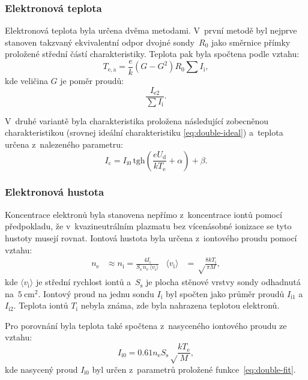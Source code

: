 \documentclass{protokol}
\newcommand\elemcharge{e}
\newcommand\boltzmann{k}
\newcommand{\tgh}{\mathrm{tgh}}
\newcommand\iion{I_\mathrm{i}}
\newcommand\dension{n_\mathrm{i}}
\newcommand\denselec{n_\mathrm{e}}
\newcommand\sheathsurf{S_\mathrm{s}}
\newcommand\tempion{T_\mathrm{i}}
\newcommand\tempelec{T_\mathrm{e}}
\newcommand\tempeleca{T_\mathrm{e,a}}
\newcommand\massion{M}
\newcommand\iioni{I_{\mathrm{i}1}}
\newcommand\iionii{I_{\mathrm{i}2}}
\newcommand\iionsat{I_{\mathrm{i}0}}
\newcommand\ielecii{I_{\mathrm{e}2}}
\newcommand\idouble{I_{\mathrm{c}}}
\newcommand\udouble{U_\mathrm{d}}
\newcommand\speedion{v_\mathrm{i}}
\newcommand\eqresist{R_0}
\begin{document}
\subsubsection{Elektronová teplota}
\label{sec:double-tempelec}
Elektronová teplota byla určena dvěma metodami.
V~první metodě byl nejprve stanoven takzvaný ekvivalentní odpor
dvojné sondy~$\eqresist$ jako směrnice přímky proložené střední
částí charakteristiky.
Teplota pak byla spočtena podle vztahu:
\begin{equation}
	\label{eq:tempeleca-double}
	\tempeleca = \frac{\elemcharge}{\boltzmann}
		(G - G^2) \eqresist \sum \iion,
\end{equation}
kde veličina $G$ je poměr proudů:
\begin{equation}
	\label{eq:g}
	\frac{\ielecii}{\sum \iion}.
\end{equation}

\newcommand\paramc{\alpha}
\newcommand\parame{\beta}
V~druhé variantě byla charakteristika proložena následující zobecněnou
charakteristikou (srovnej ideální charakteristiku \eqref{eq:double-ideal})
a~teplota určena z~nalezeného parametru:
\begin{equation}
	\label{eq:double-fit}
	\idouble = \iionsat\,
		\tgh\left(
			\frac{\elemcharge\udouble}{\boltzmann\tempelec} + \paramc
		\right)
		+ \parame.
\end{equation}

\subsubsection{Elektronová hustota}
Koncentrace elektronů byla stanovena nepřímo z~koncentrace iontů
pomocí předpokladu, že v~kvazineutrálním plazmatu bez vícenásobné ionizace
se tyto hustoty musejí rovnat.
Iontová hustota byla určena z~iontového proudu pomocí vztahu:
\begin{align}
	\label{eq:denselec-iion}
	\denselec &\approx \dension = \frac{4 \iion}
		{\sheathsurf \, \denselec \, \langle\speedion\rangle} &
	\langle\speedion\rangle &= \sqrt\frac{8 \boltzmann \tempion}{\pi\massion},
\end{align}
kde $\langle\speedion\rangle$ je střední rychlost iontů
a~$\sheathsurf$ je plocha stěnové vrstvy sondy
odhadnutá na~$\SI{5}{\centi\meter\squared}$.
Iontový proud na jednu sondu $\iion$ byl spočten jako průměr proudů
$\iioni$ a~$\iionii$.
Teplota iontů $\tempion$ nebyla známa, zde byla nahrazena teplotou elektronů.

Pro porovnání byla teplota také spočtena z~nasyceného iontového proudu
ze vztahu:
\begin{equation}
	\label{eq:denselec-iionsat}
	\iionsat = \num{0.61} \denselec\sheathsurf
		\sqrt\frac{\boltzmann\tempelec}{\massion},
\end{equation}
kde nasycený proud $\iionsat$ byl určen z~parametrů proložené
funkce~\eqref{eq:double-fit}.
\end{document}
